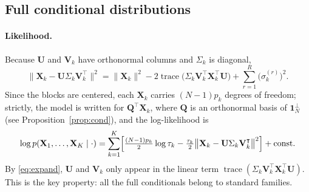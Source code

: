 \documentclass[11pt]{article}
\DeclareMathOperator{\trace}{\mathrm{trace}}
\newcommand{\X}{\mathbf{X}}
\newcommand{\U}{\mathbf{U}}
\newcommand{\V}{\mathbf{V}}
\newcommand{\Q}{\mathbf{Q}}
\newcommand{\one}{\mathbf{1}}
\begin{document}
\subsection{Full conditional distributions}

\paragraph{Likelihood.} Because $\U$ and $\V_k$ have orthonormal columns and $\Sigma_k$ is diagonal,
\begin{equation}
  \bigl\|\X_k-\U\Sigma_k\V_k^\intercal\bigr\|^2
  =\|\X_k\|^2-2\trace\bigl(\Sigma_k\V_k^\intercal\X_k^\intercal\U\bigr)+\sum_{r=1}^R\bigl(\sigma_k^{(r)}\bigr)^2 .
  \label{eq:expand}
\end{equation}
Since the blocks are centered, each $\X_k$ carries $(N-1)p_k$ degrees of freedom; strictly, the model is written for $\Q^\intercal\X_k$, where $\Q$ is an orthonormal basis of $\one_N^\perp$ (see Proposition~\ref{prop:cond}), and the log-likelihood is
\[
  \log p(\X_1,\ldots,\X_K\mid\cdot)=\sum_{k=1}^K\Bigl[\tfrac{(N-1)p_k}{2}\log\tau_k
  -\tfrac{\tau_k}{2}\bigl\|\X_k-\U\Sigma_k\V_k^\intercal\bigr\|^2\Bigr]+\text{const}.
\]
By \eqref{eq:expand}, $\U$ and $\V_k$ only appear in the linear term $\trace(\Sigma_k\V_k^\intercal\X_k^\intercal\U)$.
This is the key property: all the full conditionals belong to standard families.
\end{document}
